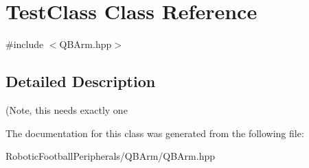 \hypertarget{class_test_class}{}\section{Test\+Class Class Reference}
\label{class_test_class}


{\ttfamily \#include $<$Q\+B\+Arm.\+hpp$>$}



\subsection{Detailed Description}
(Note, this needs exactly one 

The documentation for this class was generated from the following file\+:\begin{DoxyCompactItemize}
\item 
Robotic\+Football\+Peripherals/\+Q\+B\+Arm/Q\+B\+Arm.\+hpp\end{DoxyCompactItemize}
